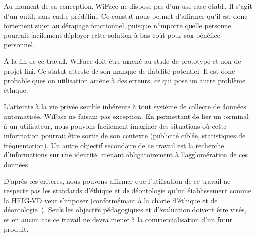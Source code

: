 Au moment de sa conception, WiFace ne dispose pas d’un use case établi. Il s’agit d’un outil, sans cadre prédéfini.
Ce constat nous permet d’affirmer qu’il est donc fortement sujet au dérapage fonctionnel, puisque n’importe quelle
personne pourrait facilement déployer cette solution à bas coût pour son bénéfice personnel.

À la fin de ce travail, WiFace doit être amené au stade de prototype et non de projet fini. Ce statut atteste de son
manque de fiabilité potentiel. Il est donc probable ques on utilisation amène à des erreurs, ce qui pose un autre
problème éthique.

L’atteinte à la vie privée semble inhérente à tout système de collecte de données automatisée, WiFace ne faisant
pas exception. En permettant de lier un terminal à un utilisateur, nous pouvons facilement imaginer des situations
où cette information pourrait être sortie de son contexte (publicité ciblée, statistiques de fréquentation). Un autre
objectif secondaire de ce travail est la recherche d’informations sur une identité, menant obligatoirement à
l’agglomération de ces données.

D’après ces critères, nous pouvons affirmer que l’utilisation de ce travail ne respecte pas les standards d’éthique et de déontologie
qu’un établissement comme la HEIG-VD veut s’imposer (conformémant à la charte d'éthique et de déontologie~\cite{HESCHARTE}). Seuls les objectifs pédagogiques et d’évaluation doivent
être visés, et en aucun cas ce travail ne devra mener à la commercialisation d’un futur produit.

